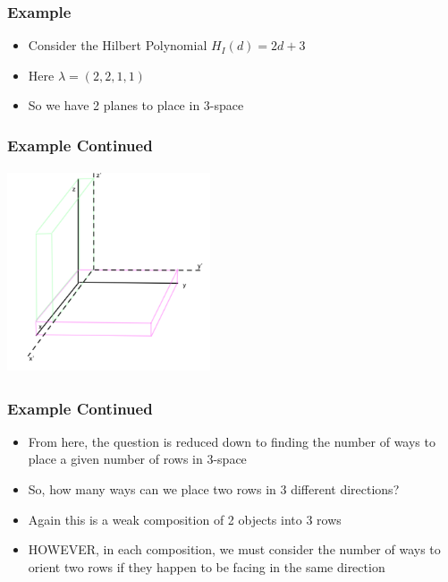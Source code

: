 \documentclass{beamer}
\begin{document}
\begin{frame}
	\frametitle{Example}
	\begin{itemize}
	\item Consider the Hilbert Polynomial $H_I(d) = 2d+3$
	\item Here $\lambda = (2,2,1,1)$
	\item So we have 2 planes to place in 3-space
	\end{itemize}
\end{frame}


\begin{frame}
	\frametitle{Example Continued}
	\begin{center}
	\includegraphics[width = 6cm, height = 6cm]{LogMMidtermPresentationImages/shifting3spacegood.png}
	\end{center}
\end{frame}


\begin{frame}
	\frametitle{Example Continued}
	\begin{itemize}
	\item From here, the question is reduced down to finding the number of ways to place a given number of rows in 3-space
	\item So, how many ways can we place two rows in 3 different directions?
	\item Again this is a weak composition of 2 objects into 3 rows
	\item HOWEVER, in each composition, we must consider the number of ways to orient two rows if they happen to be facing in the same direction 
	\end{itemize}
\end{frame}
\end{document}
